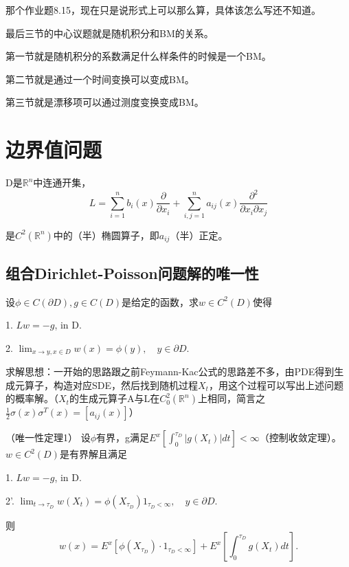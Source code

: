 那个作业题8.15，现在只是说形式上可以那么算，具体该怎么写还不知道。

最后三节的中心议题就是随机积分和BM的关系。

第一节就是随机积分的系数满足什么样条件的时候是一个BM。

第二节就是通过一个时间变换可以变成BM。

第三节就是漂移项可以通过测度变换变成BM。

\section{边界值问题}

D是$\mathbb{R}^n$中连通开集，
\[
  L=\sum_{i=1}^{n} b_{i}(x) \frac{\partial}{\partial x_{i}}+\sum_{i, j=1}^{n} a_{i j}(x) \frac{\partial^{2}}{\partial x_{i} \partial x_{j}}
\]

是$C^2(\mathbb{R}^n)$中的（半）椭圆算子，即$a_{ij}$（半）正定。

\subsection{组合Dirichlet-Poisson问题解的唯一性}

设$\phi \in C(\partial D), g \in C(D)$是给定的函数，求$w \in C^{2}(D)$使得

1. $L w=-g$, in D.

2. $\lim_{x \rightarrow y, x \in D} w(x)=\phi(y), \quad y \in \partial D$.

求解思想：一开始的思路跟之前Feymann-Kac公式的思路差不多，由PDE得到生成元算子，构造对应SDE，然后找到随机过程$X_t$，用这个过程可以写出上述问题的概率解。（$X_{t}$的生成元算子A与L在$C_{0}^{2}\left(\mathbb{R}^{n}\right)$上相同，简言之$\frac{1}{2} \sigma(x) \sigma^{T}(x)=\left[a_{i j}(x)\right]$）

\begin{thm}（唯一性定理1）
  设$\phi$有界，g满足$E^{x}\left[\int_{0}^{\tau_{D}}|g\left(X_{t}\right)| d t\right]<\infty$（控制收敛定理）。$w \in C^{2}(D)$是有界解且满足
  
  1. $L w=-g$, in D.
  
  2'. $\lim_{t \rightarrow \tau_{D}} w\left(X_{t}\right)=\phi\left(X_{\tau_{D}}\right) 1_{\tau_{D}<\infty}, \quad y \in \partial D$. 
  
  则
  \[
    w(x)=E^{x}\left[\phi\left(X_{\tau_{D}}\right) \cdot 1_{\tau_{D}<\infty}\right]+E^{x}\left[\int_{0}^{\tau_{D}} g\left(X_{t}\right) d t\right] .
  \]
\end{thm}

